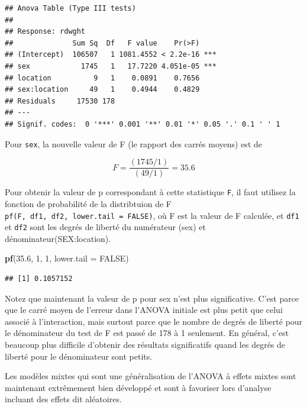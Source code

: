 \documentclass[
  12pt,
]{book}
\makeatletter
\newenvironment{Shaded}{\begin{snugshade}}{\end{snugshade}}
\newcommand{\DataTypeTok}[1]{\textcolor[rgb]{0.13,0.29,0.53}{#1}}
\newcommand{\DecValTok}[1]{\textcolor[rgb]{0.00,0.00,0.81}{#1}}
\newcommand{\FloatTok}[1]{\textcolor[rgb]{0.00,0.00,0.81}{#1}}
\newcommand{\KeywordTok}[1]{\textcolor[rgb]{0.13,0.29,0.53}{\textbf{#1}}}
\newcommand{\NormalTok}[1]{#1}
\newcommand{\OtherTok}[1]{\textcolor[rgb]{0.56,0.35,0.01}{#1}}
\newenvironment{kframe}{%
\medskip{}
\setlength{\fboxsep}{.8em}
\def\at@end@of@kframe{}%
\ifinner\ifhmode%
 \def\at@end@of@kframe{\end{minipage}}%
 \begin{minipage}{\columnwidth}%
\fi\fi%
\def\FrameCommand##1{\hskip\@totalleftmargin \hskip-\fboxsep
\colorbox{incolor}{##1}\hskip-\fboxsep
    \hskip-\linewidth \hskip-\@totalleftmargin \hskip\columnwidth}%
\MakeFramed {\advance\hsize-\width
  \@totalleftmargin\z@ \linewidth\hsize
  \@setminipage}}%
{\par\unskip\endMakeFramed%
\at@end@of@kframe}
\newenvironment{rmdblock}[1]
 {
 \begin{itemize}
 \renewcommand{\labelitemi}{
   \raisebox{-.7\height}[0pt][0pt]{
     {\setkeys{Gin}{width=3em,keepaspectratio}\texttt{[image: images/\#1]}}
   }
 }
 \begin{kframe}
 \setlength{\fboxsep}{1em}
 \item
 }
 {
 \end{kframe}
 \end{itemize}
 }
\newenvironment{rmdnote}
  {\begin{rmdblock}{note}}
  {\end{rmdblock}}
\makeatother
\begin{document}
\begin{verbatim}
## Anova Table (Type III tests)
## 
## Response: rdwght
##              Sum Sq  Df   F value    Pr(>F)    
## (Intercept)  106507   1 1081.4552 < 2.2e-16 ***
## sex            1745   1   17.7220 4.051e-05 ***
## location          9   1    0.0891    0.7656    
## sex:location     49   1    0.4944    0.4829    
## Residuals     17530 178                        
## ---
## Signif. codes:  0 '***' 0.001 '**' 0.01 '*' 0.05 '.' 0.1 ' ' 1
\end{verbatim}

Pour \texttt{sex}, la nouvelle valeur de F (le rapport des carrés moyens) est de

\[F = \frac{(1745/1)}{(49/1)} = 35.6\]

Pour obtenir la valeur de p correspondant à cette statistique \texttt{F}, il faut utilisez la fonction de probabilité de la distribtuion de F \texttt{pf(F,\ df1,\ df2,\ lower.tail\ =\ FALSE)}, où F est la valeur de F calculée, et \texttt{df1} et \texttt{df2} sont les degrés de liberté du numérateur (sex) et dénominateur(SEX:location).

\begin{Shaded}
\begin{Highlighting}[]
\KeywordTok{pf}\NormalTok{(}\FloatTok{35.6}\NormalTok{, }\DecValTok{1}\NormalTok{, }\DecValTok{1}\NormalTok{, }\DataTypeTok{lower.tail =} \OtherTok{FALSE}\NormalTok{)}
\end{Highlighting}
\end{Shaded}

\begin{verbatim}
## [1] 0.1057152
\end{verbatim}

Notez que maintenant la valeur de p pour sex n'est plus significative. C'est parce que le carré moyen de l'erreur dans l'ANOVA initiale est plus petit que celui associé à l'interaction, mais surtout parce que le nombre de degrés de liberté pour le dénominateur du test de F est passé de 178 à 1 seulement. En général, c'est beaucoup plus difficile d'obtenir des résultats significatifs quand les degrés de liberté pour le dénominateur sont petits.

\begin{rmdnote}
Les modèles mixtes qui sont une généralisation de l'ANOVA à effets mixtes sont maintenant extrêmement bien développé et sont à favoriser lors d'analyse incluant des effets dit aléatoires.
\end{rmdnote}
\end{document}
